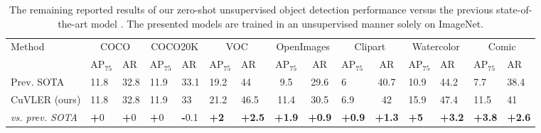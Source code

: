 
\begin{table}[H]
\centering
\begin{tabular}{p{2.7cm}|p{0.6cm}p{0.75cm}|p{0.6cm}p{0.65cm}|p{0.6cm}p{0.75cm}|cc|p{0.65cm}c|p{0.6cm}p{0.6cm}|p{0.6cm}p{0.75cm}|}
\multirow{2}{*}{Method}&\multicolumn{2}{c|}{COCO}&\multicolumn{2}{c|}{COCO20K}&\multicolumn{2}{c|}{VOC}&\multicolumn{2}{c|}{OpenImages}&\multicolumn{2}{c|}{Clipart}&\multicolumn{2}{c|}{Watercolor}&\multicolumn{2}{c|}{Comic}\\ \cline{2-15}
&AP$_{75}$&AR&AP$_{75}$&AR&AP$_{75}$&AR&AP$_{75}$&AR&AP$_{75}$&AR&AP$_{75}$&AR&AP$_{75}$&AR\\ \hline
Prev. SOTA &11.8&32.8&11.9&33.1&19.2&44&9.5&29.6&6&40.7&10.9&44.2&7.7&38.4\\
CuVLER (ours)&11.8&32.8&11.9&33&21.2&46.5&11.4&30.5&6.9&42&15.9&47.4&11.5&41\\
\textit{vs. prev. SOTA}&\textbf+0&\textbf+0&\textbf+0&\textbf-0.1&\textbf{+2}&\textbf{+2.5}&\textbf{+1.9}&\textbf{+0.9}&\textbf{+0.9}&\textbf{+1.3}&\textbf{+5}&\textbf{+3.2}&\textbf{+3.8}&\textbf{+2.6}\\
\hline
\end{tabular}
\caption{The remaining reported results of our zero-shot unsupervised object detection performance versus the previous state-of-the-art model \cite{wang2023cut}. The presented models are trained in an unsupervised manner solely on ImageNet.}
\label{tab:zeroshot-extra-results}
\end{table}

\restoregeometry


